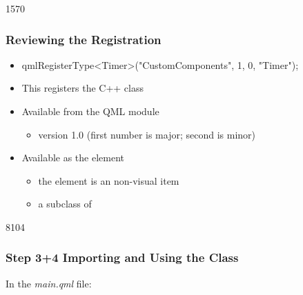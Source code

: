 
\begin{slide}[fragile]{1570}  \frametitle{Reviewing the Registration}

\begin{itemize}
\item[]
\begin{cpp}
qmlRegisterType<Timer>("CustomComponents", 1, 0, "Timer");
\end{cpp}

\item  This registers the  C++ class
\medskip
\item Available from the  QML module
  \begin{itemize}
  \item version 1.0 (first number is major; second is minor)
  \end{itemize}
\item Available as the  element
  \begin{itemize}
  \item the  element is an non-visual item
  \item a subclass of 
  \end{itemize}
\end{itemize}
\end{slide}



\begin{slide}[fragile]{8104}\frametitle{Step 3+4 Importing and Using the Class}

In the \textit{main.qml} file:

\vspace*{0.5em}
\begin{qml}
\\
\\
\vspace*{0.5em}
\\
\\
\\
\vspace*{0.5em}
\\
\\
\\
\vspace*{0.5em}
\qtt{~~~~\}}\\
\qtt{\}}\\
\end{qml}

\end{slide}

